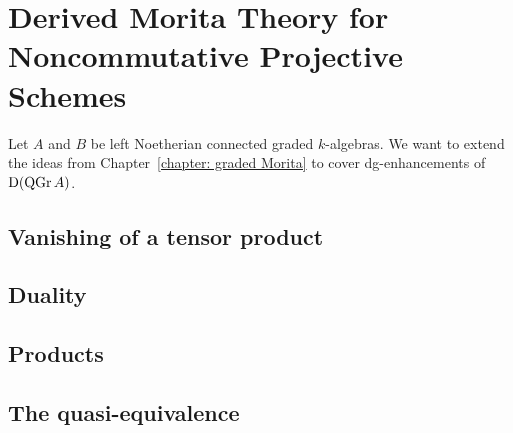 \chapter{Derived Morita Theory for Noncommutative Projective Schemes} \label{section: morita for NCP}

Let \(A\) and \(B\) be left Noetherian connected graded \(k\)-algebras.
We want to extend the ideas from Chapter~\ref{chapter: graded Morita} to cover dg-enhancements of \(\mathrm{D}(\operatorname{QGr}A)\).

\section{Vanishing of a tensor product} \label{subsection: vanishing of tensor}


\section{Duality}


\section{Products} \label{section: products}


\section{The quasi-equivalence}


